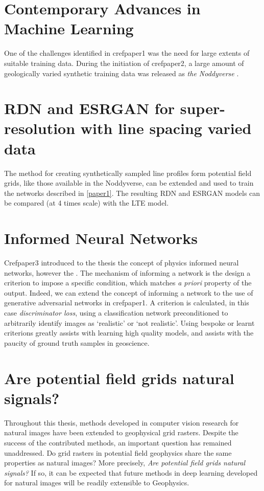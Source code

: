 \documentclass[manuscript.tex]{subfiles}
\begin{document}
\label{discussion}
\section{Contemporary Advances in Machine Learning} %


One of the challenges identified in cref{paper1} was the need for large extents of suitable training data.
During the initiation of cref{paper2}, a large amount of geologically varied synthetic training data was released as \emph{the Noddyverse} \parencite{jessellNoddyverseMassiveData2022}.

\section{RDN and ESRGAN for super-resolution with line spacing varied data}
The method for creating synthetically sampled line profiles form potential field grids, like those available in the Noddyverse, can be extended and used to train the networks described in \cref{paper1}.
The resulting RDN and ESRGAN models can be compared (at 4 times scale) with the LTE model.


\section{Informed Neural Networks}
Cref{paper3} introduced to the thesis the concept of physics informed neural networks, however the .
The mechanism of informing a network is the design a criterion to impose a specific condition, which matches \emph{a priori} property of the output.
Indeed, we can extend the concept of informing a network to the use of generative adversarial networks in cref{paper1}.
A criterion is calculated, in this case \emph{discriminator loss}, using a classification network preconditioned to arbitrarily identify images as `realistic' or `not realistic'.
Using bespoke or learnt criterions greatly assists with learning high quality models, and assists with the paucity of ground truth samples in geoscience.


\section{Are potential field grids natural signals?}
Throughout this thesis, methods developed in computer vision research for natural images have been extended to geophysical grid rasters.
Despite the success of the contributed methods, an important question has remained unaddressed.
Do grid rasters in potential field geophysics share the same properties as natural images?
More precisely, \emph{Are potential field grids natural signals?}
If so, it can be expected that future methods in deep learning developed for natural images will be readily extensible to Geophysics.
\Textcite{donohoCompressedSensing2006}

\end{document}
